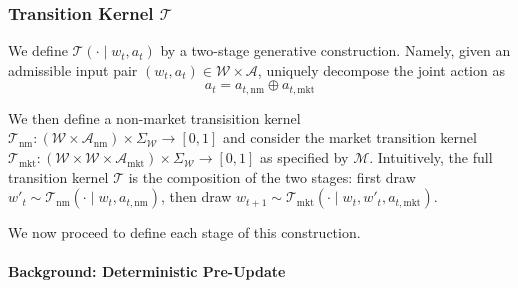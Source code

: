 \subsubsection{Transition Kernel $\mathcal{T}$}

We define $\mathcal{T}(\cdot\mid w_t,a_t)$ by a two-stage generative construction. Namely, given an admissible input pair $(w_t,a_t) \in \mathcal{W} \times \mathcal{A}$, uniquely decompose the joint action as
\[
a_t = a_{t,\mathrm{nm}} \oplus a_{t,\mathrm{mkt}}
\]

We then define a non-market transisition kernel $\mathcal{T}_{\mathrm{nm}} : (\mathcal{W} \times \mathcal{A}_\mathrm{nm}) \times \Sigma_{\mathcal{W}} \to [0,1]$ and consider the market transition kernel $\mathcal{T}_{\mathrm{mkt}} : (\mathcal{W} \times \mathcal{W} \times \mathcal{A}_\mathrm{mkt}) \times \Sigma_{\mathcal{W}} \to [0,1]$ as specified by $\mathscr{M}$. Intuitively, the full transition kernel $\mathcal{T}$ is the composition of the two stages:
first draw $w'_t\sim \mathcal{T}_{\mathrm{nm}}(\cdot\mid w_t,a_{t,\mathrm{nm}})$, then draw
$w_{t+1}\sim \mathcal{T}_{\mathrm{mkt}}(\cdot\mid w_t,w'_t,a_{t,\mathrm{mkt}})$.

We now proceed to define each stage of this construction.

\paragraph{Background: Deterministic Pre-Update}
 
